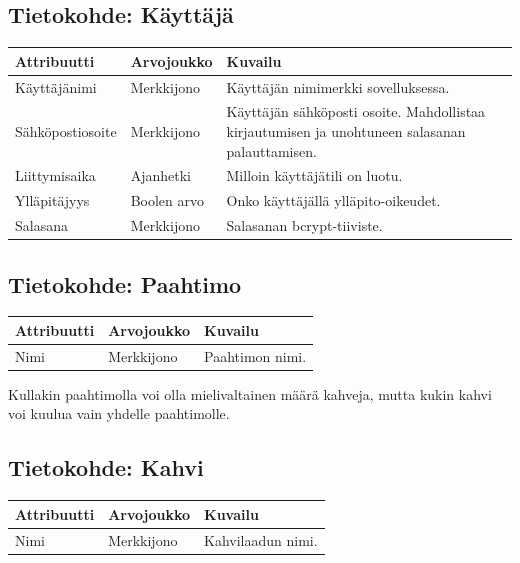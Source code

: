 \documentclass[a4paper,titlepage]{article}
\begin{document}
\subsection{Tietokohde: Käyttäjä}

\begin{center}
\begin{tabularx}{\textwidth}{|X|X|X|}
\hline
Attribuutti & Arvojoukko & Kuvailu \\
\hline
Käyttäjänimi     & Merkkijono & Käyttäjän nimimerkki sovelluksessa. \\
Sähköpostiosoite & Merkkijono & Käyttäjän sähköposti osoite. Mahdollistaa kirjautumisen ja unohtuneen salasanan palauttamisen. \\
Liittymisaika    & Ajanhetki  & Milloin käyttäjätili on luotu. \\
Ylläpitäjyys     & Boolen arvo & Onko käyttäjällä ylläpito-oikeudet. \\
Salasana         & Merkkijono & Salasanan bcrypt-tiiviste. \\
\hline
\end{tabularx}
\end{center}

\subsection{Tietokohde: Paahtimo}

\begin{center}
\begin{tabularx}{\textwidth}{|X|X|X|}
\hline
Attribuutti & Arvojoukko & Kuvailu \\
\hline
Nimi & Merkkijono & Paahtimon nimi. \\
\hline
\end{tabularx}
\end{center}

Kullakin paahtimolla voi olla mielivaltainen määrä kahveja, mutta kukin kahvi voi kuulua vain yhdelle paahtimolle.

\subsection{Tietokohde: Kahvi}

\begin{center}
\begin{tabularx}{\textwidth}{|X|X|X|}
\hline
Attribuutti & Arvojoukko & Kuvailu \\
\hline
Nimi & Merkkijono & Kahvilaadun nimi. \\
\hline
\end{tabularx}
\end{center}
\end{document}
